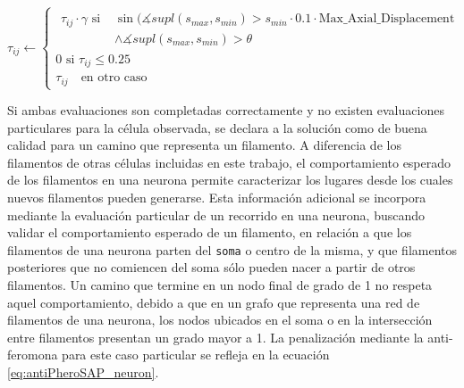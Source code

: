 \begin{equation}
    \tau_{ij} \leftarrow
        \begin{cases}
        \begin{split}
         \tau_{ij} \cdot \gamma \text{ si } & \sin(\measuredangle supl(s_{max},s_{min}) > s_{min} \cdot 0.1 \cdot \text{Max\_Axial\_Displacement} \\ & \land \measuredangle supl(s_{max},s_{min}) > \theta    
        \end{split}
        \\[3ex]
        
        \text{0 si } \tau_{ij} \leq 0.25 \\[3ex]
        \tau_{ij} \quad \text{en otro caso}
        \end{cases}
    \label{eq:antiPheroSAP_Axial}
\end{equation}

Si ambas evaluaciones son completadas correctamente y no existen evaluaciones particulares para la c\'elula observada, se declara a la soluci\'on como de buena calidad para un camino que representa un filamento. A diferencia de los filamentos de otras c\'elulas incluidas en este trabajo, el comportamiento esperado de los filamentos en una neurona permite caracterizar los lugares desde los cuales nuevos filamentos pueden generarse. Esta informaci\'on adicional se incorpora mediante la evaluaci\'on particular de un recorrido en una neurona, buscando validar el comportamiento esperado de un filamento, en relaci\'on a que los filamentos de una neurona parten del {\tt soma} o centro de la misma, y que filamentos posteriores que no comiencen del soma s\'olo pueden nacer a partir de otros filamentos. Un camino que termine en un nodo final de grado de 1 no respeta aquel comportamiento, debido a que en un grafo que representa una red de filamentos de una neurona, los nodos ubicados en el soma o en la intersecci\'on entre filamentos presentan un grado mayor a 1. La penalizaci\'on mediante la anti-feromona para este caso particular se refleja en la ecuaci\'on \ref{eq:antiPheroSAP_neuron}.

